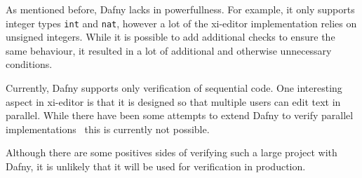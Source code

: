 As mentioned before, Dafny lacks in powerfullness.
For example, it only supports integer types \texttt{int} and \texttt{nat}, however a lot of the xi-editor implementation relies on unsigned integers.
While it is possible to add additional checks to ensure the same behaviour, it resulted in a lot of additional and otherwise unnecessary conditions.

Currently, Dafny supports only verification of sequential code.
One interesting aspect in xi-editor is that it is designed so that multiple users can edit text in parallel.
While there have been some attempts to extend Dafny to verify parallel implementations~\cite{mediero2017verification} this is currently not possible.

Although there are some positives sides of verifying such a large project with Dafny, it is unlikely that it will be used for verification in production.

